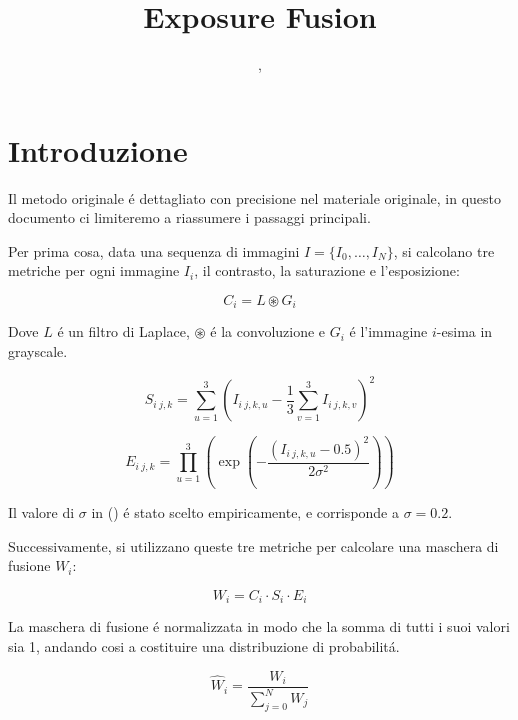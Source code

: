 \documentclass[10pt,journal,cspaper,compsoc]{IEEEtran}
\title{Exposure Fusion}
\author{
    \IEEEauthorblockN{Dario Loi}
    \IEEEauthorblockA{(1940849)},
    \IEEEauthorblockN{Flavio Gezzi}
    \IEEEauthorblockA{(???)}
}
\begin{document}
\maketitle



\section{Introduzione}

Il metodo originale é dettagliato con precisione nel materiale originale\cite{stanford:exposure_fusion},
in questo documento ci limiteremo a riassumere i passaggi principali. 

Per prima cosa, data una sequenza di immagini $ I = \{ I_0, \dots, I_N \} $, si calcolano
tre metriche per ogni immagine $ I_i $, il contrasto, la saturazione e l'esposizione:

\begin{equation}
    \label{eq:contrast}
    C_i = L \circledast G_i
\end{equation}

Dove $ L $ é un filtro di Laplace, $ \circledast $ é la convoluzione e $ G_i $ é l'immagine $ i $-esima in
grayscale.

\begin{equation}
    \label{eq:saturation}
    S_{i\ j,k} = \sum_{u=1}^3 \left( I_{i\ j,k,u} - \frac{1}{3} \sum_{v=1}^3 I_{i\ j,k,v} \right)^2
\end{equation}

\begin{equation}
    \label{eq:exposure}
    E_{i\ j,k} = \prod_{u=1}^3 \left( \exp(-\frac{(I_{i\ j,k,u} - 0.5)^2}{2 \sigma^2}) \right)
\end{equation}

Il valore di $ \sigma $ in () é stato scelto empiricamente, e 
corrisponde a $\sigma = 0.2$.

Successivamente, si utilizzano queste tre metriche per calcolare una maschera di fusione $W_i$:

\begin{equation}
    \label{eq:fusion_mask}
    W_i = C_i \cdot S_i \cdot E_i
\end{equation}

La maschera di fusione é normalizzata in modo che la somma di tutti i suoi valori sia 1, andando 
cosi a costituire una distribuzione di probabilitá.

\begin{equation}
    \label{eq:fusion_mask_normalization}
    \hat{W}_i = \frac{W_i}{\sum_{j=0}^N W_j}
\end{equation}
\end{document}
